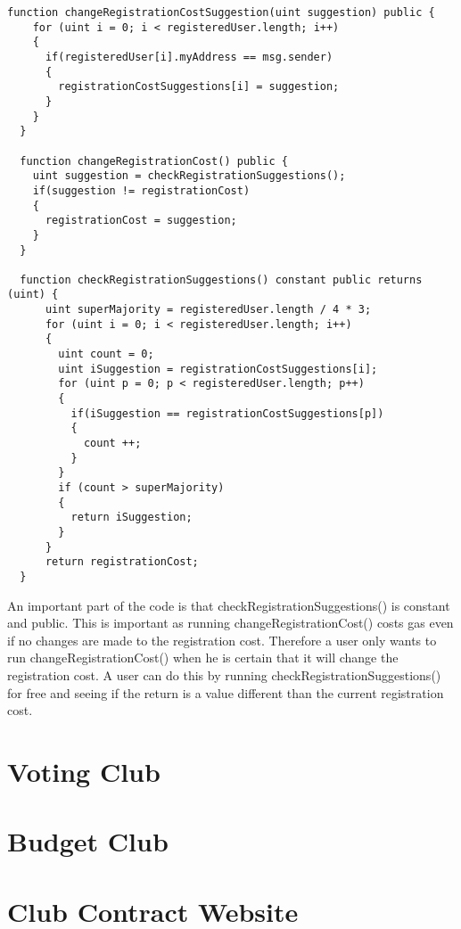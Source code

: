 \begin{lstlisting}
function changeRegistrationCostSuggestion(uint suggestion) public {
    for (uint i = 0; i < registeredUser.length; i++)
    {
      if(registeredUser[i].myAddress == msg.sender)
      {
        registrationCostSuggestions[i] = suggestion;
      }
    }
  }

  function changeRegistrationCost() public {
    uint suggestion = checkRegistrationSuggestions();
    if(suggestion != registrationCost)
    {
      registrationCost = suggestion;
    }
  }

  function checkRegistrationSuggestions() constant public returns (uint) {
      uint superMajority = registeredUser.length / 4 * 3;
      for (uint i = 0; i < registeredUser.length; i++)
      {
        uint count = 0;
        uint iSuggestion = registrationCostSuggestions[i];
        for (uint p = 0; p < registeredUser.length; p++)
        {
          if(iSuggestion == registrationCostSuggestions[p])
          {
            count ++;
          }
        }
        if (count > superMajority)
        {
          return iSuggestion;
        }
      }
      return registrationCost;
  }
\end{lstlisting}
An important part of the code is that checkRegistrationSuggestions() is constant and public. This is important as running changeRegistrationCost() costs gas even if no changes are made to the registration cost. Therefore a user only wants to run changeRegistrationCost() when he is certain that it will change the registration cost. A user can do this by running checkRegistrationSuggestions() for free and seeing if the return is a value different than the current registration cost.
\section{Voting Club}
\section{Budget Club}
\section{Club Contract Website}